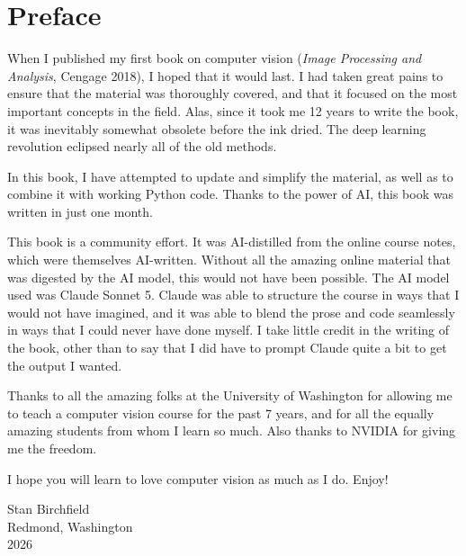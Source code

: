 \chapter*{Preface}

When I published my first book on computer vision (\textit{Image Processing and Analysis}, Cengage 2018), I hoped that it would last.  I had taken great pains to ensure that the material was thoroughly covered, and that it focused on the most important concepts in the field. Alas, since it took me 12 years to write the book, it was inevitably somewhat obsolete before the ink dried. The deep learning revolution eclipsed nearly all of the old methods.

In this book, I have attempted to update and simplify the material, as well as to combine it with working Python code. Thanks to the power of AI, this book was written in just one month.

This book is a community effort.  It was AI-distilled from the online course notes, which were themselves AI-written.  Without all the amazing online material that was digested by the AI model, this would not have been possible.  The AI model used was Claude Sonnet 5.  Claude was able to structure the course in ways that I would not have imagined, and it was able to blend the prose and code seamlessly in ways that I could never have done myself.  I take little credit in the writing of the book, other than to say that I did have to prompt Claude quite a bit to get the output I wanted.

Thanks to all the amazing folks at the University of Washington for allowing me to teach a computer vision course for the past 7 years, and for all the equally amazing students from whom I learn so much. Also thanks to NVIDIA for giving me the freedom.

I hope you will learn to love computer vision as much as I do.  Enjoy!

\bigskip
\begin{flushright}
Stan Birchfield\\
Redmond, Washington\\
2026
\end{flushright}


